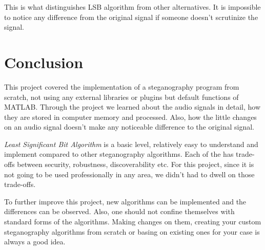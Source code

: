 \documentclass[twocolumns]{IEEEtran}
\begin{document}
	This is what distinguishes LSB algorithm from other alternatives. It is impossible to notice any difference from the original signal if someone doesn't scrutinize the signal.  
	
	\section{Conclusion}
	This project covered the implementation of a steganography program from scratch, not using any external libraries or plugins but default functions of MATLAB. Through the project we learned about the audio signals in detail, how they are stored in computer memory and processed. Also, how the little changes on an audio signal doesn't make any noticeable difference to the original signal.
	
	\textit{Least Significant Bit Algorithm} is a basic level, relatively easy to understand and implement compared to other steganography algorithms. Each of the has trade-offs between security, robustness, discoverability etc. For this project, since it is not going to be used professionally in any area, we didn't had to dwell on those trade-offs. 
	
	To further improve this project, new algorithms can be implemented and the differences can be observed. Also, one should not confine themselves with standard forms of the algorithms. Making changes on them, creating your custom steganography algorithms from scratch or basing on existing ones for your case is always a good idea. 
	
	
	
	
\end{document}
